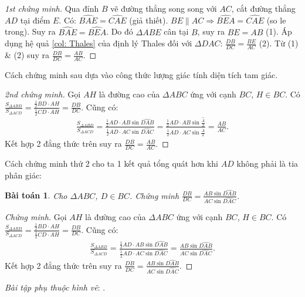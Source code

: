 \documentclass{article}
\newtheorem{baitoan}{Bài toán}
\begin{document}
\begin{proof}[1st chứng minh]
	Qua đỉnh $B$ vẽ đường thẳng song song với $AC$, cắt đường thẳng $AD$ tại điểm $E$. Có: $\widehat{BAE} = \widehat{CAE}$ (giả thiết). $BE\parallel AC\Rightarrow\widehat{BEA} = \widehat{CAE}$ (so le trong). Suy ra $\widehat{BAE} = \widehat{BEA}$. Do đó $\Delta ABE$ cân tại $B$, suy ra $BE = AB$ (1). Áp dụng hệ quả \ref{col: Thales} của định lý Thales đối với $\Delta DAC$: $\frac{DB}{DC} = \frac{BE}{AC}$ (2). Từ (1) \& (2) suy ra $\frac{DB}{DC} = \frac{AB}{AC}$.
\end{proof}
Cách chứng minh sau dựa vào công thức lượng giác tính diện tích tam giác.
\begin{proof}[2nd chứng minh]
	Gọi $AH$ là đường cao của $\Delta ABC$ ứng với cạnh $BC$, $H\in BC$. Có $\frac{S_{\Delta ABD}}{S_{\Delta ACD}} = \frac{\frac{1}{2}BD\cdot AH}{\frac{1}{2}CD\cdot AH} = \frac{DB}{DC}$. Cũng có:
	\begin{align*}
		\frac{S_{\Delta ABD}}{S_{\Delta ACD}} = \frac{\frac{1}{2}AD\cdot AB\sin\widehat{DAB}}{\frac{1}{2}AD\cdot AC\sin\widehat{DAC}} = \frac{\frac{1}{2}AD\cdot AB\sin\frac{\widehat{A}}{2}}{\frac{1}{2}AD\cdot AC\sin\frac{\widehat{A}}{2}} = \frac{AB}{AC}.
	\end{align*}
	Kết hợp 2 đẳng thức trên suy ra $\frac{DB}{DC} = \frac{AB}{AC}$.
\end{proof}
Cách chứng minh thứ 2 cho ta 1 kết quả tổng quát hơn khi $AD$ không phải là tia phân giác:

\begin{baitoan}
	Cho $\Delta ABC$, $D\in BC$. Chứng minh $\frac{DB}{DC} = \frac{AB\sin\widehat{DAB}}{AC\sin\widehat{DAC}}$.
\end{baitoan}

\begin{proof}[Chứng minh]
	Gọi $AH$ là đường cao của $\Delta ABC$ ứng với cạnh $BC$, $H\in BC$. Có $\frac{S_{\Delta ABD}}{S_{\Delta ACD}} = \frac{\frac{1}{2}BD\cdot AH}{\frac{1}{2}CD\cdot AH} = \frac{DB}{DC}$. Cũng có:
	\begin{align*}
		\frac{S_{\Delta ABD}}{S_{\Delta ACD}} = \frac{\frac{1}{2}AD\cdot AB\sin\widehat{DAB}}{\frac{1}{2}AD\cdot AC\sin\widehat{DAC}} = \frac{AB\sin\widehat{DAB}}{AC\sin\widehat{DAC}}.
	\end{align*}
	Kết hợp 2 đẳng thức trên suy ra $\frac{DB}{DC} = \frac{AB\sin\widehat{DAB}}{AC\sin\widehat{DAC}}$.
\end{proof}
\noindent\textit{Bài tập phụ thuộc hình vẽ}: \cite[?2--?3, 15. p. 67]{SGK_Toan_8_tap_2}.
\end{document}
